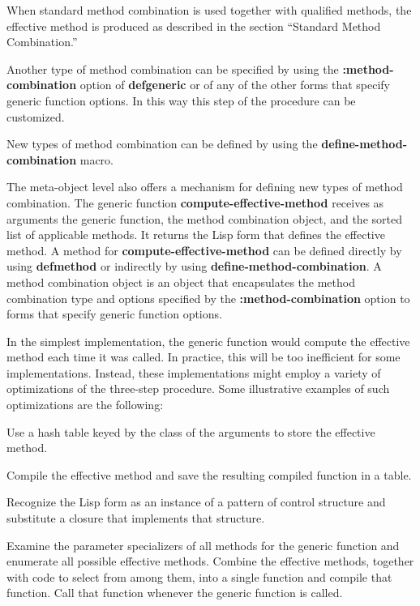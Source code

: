 When standard method combination is used together with qualified methods, 
the effective method is produced as described in the section
``Standard Method Combination.''

Another type of method combination can be specified by using the {\bf
:method-combination} option of {\bf defgeneric} or of any of the other
forms that specify generic function options.  In this way this step of
the procedure can be customized.

New types of method combination can be defined by using the 
{\bf define-method-combination} macro. 

\goodbreak

The meta-object level also offers a mechanism for defining new types
of method combination.  The generic function {\bf
compute-effective-method} receives as arguments the generic function,
the method combination object, and the sorted list of applicable
methods.  It returns the Lisp form that defines the effective method.
A method for {\bf compute-effective-method} can be defined directly by
using {\bf defmethod} or indirectly by using {\bf
define-method-combination}.  A {\bit method combination object} is an
object that encapsulates the method combination type and options
specified by the {\bf :method-combination} option to forms that
specify generic function options.

\endsubsubsection

\newpage

\beginImplNote
In the simplest implementation, the generic function would compute
the effective method each time it was called.  In practice, this will
be too inefficient for some implementations.  Instead, these
implementations might employ a variety of optimizations of the
three-step procedure. Some illustrative examples of such optimizations
are the following:

\beginlist

\item{\bull} Use a hash table keyed by the class of the arguments to
store the effective method.

\item{\bull} Compile the effective method and save the resulting
compiled function in a table.

\item{\bull} Recognize the Lisp form as an instance of a pattern of
control structure and substitute a closure that implements
that structure.

\item{\bull} Examine the parameter specializers of all methods for the
generic function and enumerate all possible effective methods.
Combine the effective methods, together with code to select from
among them, into a single function and compile that function.  Call
that function whenever the generic function is called.
\endlist
\endImplNote


